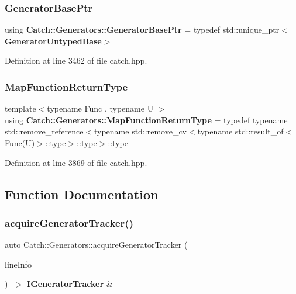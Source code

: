 \subsubsection{GeneratorBasePtr}
{\footnotesize\ttfamily using \textbf{ Catch\+::\+Generators\+::\+Generator\+Base\+Ptr} = typedef std\+::unique\+\_\+ptr$<$\textbf{ Generator\+Untyped\+Base}$>$}



Definition at line 3462 of file catch.\+hpp.

\mbox{\label{namespace_catch_1_1_generators_aa509b9b4dd25a6d6309ce8c7da441c02}} 
\subsubsection{MapFunctionReturnType}
{\footnotesize\ttfamily template$<$typename Func , typename U $>$ \\
using \textbf{ Catch\+::\+Generators\+::\+Map\+Function\+Return\+Type} = typedef typename std\+::remove\+\_\+reference$<$typename std\+::remove\+\_\+cv$<$typename std\+::result\+\_\+of$<$Func(U)$>$\+::type$>$\+::type$>$\+::type}



Definition at line 3869 of file catch.\+hpp.



\subsection{Function Documentation}
\mbox{\label{namespace_catch_1_1_generators_a36413e3baec520d89d21bea23b7bea5b}} 
\subsubsection{acquireGeneratorTracker()}
{\footnotesize\ttfamily auto Catch\+::\+Generators\+::acquire\+Generator\+Tracker (\begin{DoxyParamCaption}\item[{\textbf{ Source\+Line\+Info} const \&}]{line\+Info }\end{DoxyParamCaption}) -\/$>$  \textbf{ I\+Generator\+Tracker} \&}

